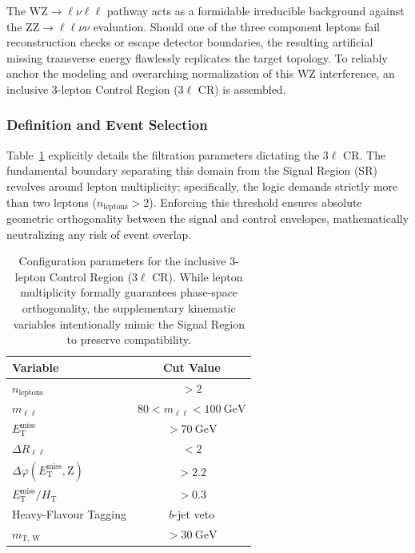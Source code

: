 The $\text{WZ} \to \ell\nu\ell\ell$ pathway acts as a formidable irreducible background against the $\text{ZZ} \to \ell\ell\nu\nu$ evaluation. Should one of the three component leptons fail reconstruction checks or escape detector boundaries, the resulting artificial missing transverse energy flawlessly replicates the target topology. To reliably anchor the modeling and overarching normalization of this $\text{WZ}$ interference, an inclusive 3-lepton Control Region (3$\ell$ CR) is assembled.

\subsubsection{Definition and Event Selection}

Table~\ref{table:3lCR_definition_sim} explicitly details the filtration parameters dictating the 3$\ell$ CR. The fundamental boundary separating this domain from the Signal Region (SR) revolves around lepton multiplicity; specifically, the logic demands strictly more than two leptons ($n_{\text{leptons}} > 2$). Enforcing this threshold ensures absolute geometric orthogonality between the signal and control envelopes, mathematically neutralizing any risk of event overlap.
\begin{table}[!htbp]
\centering
\begin{tabular}{|l|c|}
\hline
\textbf{Variable} & \textbf{Cut Value} \\ 
\hline 
$n_{\text{leptons}}$ & $> 2$ \\
\hline 
$m_{\ell\ell}$ & $80 < m_{\ell\ell} < 100~\text{GeV}$ \\
\hline 
$E_{\text{T}}^{\text{miss}}$ & $> 70~\text{GeV}$ \\
\hline 
$\Delta R_{\ell\ell}$ & $< 2$ \\ 
\hline 
$\Delta \varphi(E_{\text{T}}^{\text{miss}}, \text{Z})$ & $> 2.2 $ \\
\hline 
$E_{\text{T}}^{\text{miss}} / H_{\text{T}}$ & $> 0.3$ \\
\hline 
Heavy-Flavour Tagging & $b$-jet veto \\
\hline 
$m_{\text{T, W}}$ & $> 30~\text{GeV}$ \\ 
\hline
\end{tabular}
\caption{Configuration parameters for the inclusive 3-lepton Control Region (3$\ell$ CR). While lepton multiplicity formally guarantees phase-space orthogonality, the supplementary kinematic variables intentionally mimic the Signal Region to preserve compatibility.}
\label{table:3lCR_definition_sim}
\end{table}

